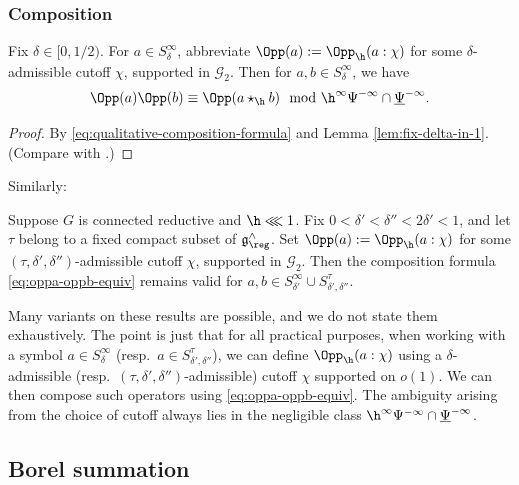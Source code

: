\subsubsection{Composition}

\begin{theorem}\label{thm:composition-formula-quantitative}
  Fix $\delta \in [0,1/2)$.  For \(a \in S_\delta^\infty\), abbreviate $\Opp(a) := \Opp_{\h}(a:\chi)$ for some $\delta$-admissible cutoff $\chi$, supported in $\mathcal{G}_2$.  Then for $a,b \in S_\delta^\infty$, we have
  \begin{equation}\label{eq:oppa-oppb-equiv}
    \Opp(a) \Opp(b) \equiv \Opp(a \star_{\h} b) \mod{ \h^\infty \Psi^{-\infty} \cap \underline{\Psi }^{-\infty}}.
  \end{equation}
\end{theorem}
\begin{proof}
  By \eqref{eq:qualitative-composition-formula} and Lemma \ref{lem:fix-delta-in-1}.  (Compare with \cite[Thm 10.8, (10.8)]{2020arXiv201202187N}.)
\end{proof}

Similarly:
\begin{theorem}
  Suppose $G$ is connected reductive and $\h \lll 1$.  Fix $0 < \delta ' < \delta '' < 2 \delta ' < 1$, and let $\tau$ belong to a fixed compact subset of $\mathfrak{g}^\wedge_{\reg}$.  Set $\Opp(a) := \Opp_{\h}(a:\chi)$ for some $(\tau, \delta ', \delta'')$-admissible cutoff $\chi$, supported in $\mathcal{G}_2$.  Then the composition formula \eqref{eq:oppa-oppb-equiv} remains valid for $a,b \in S_{\delta '}^{\infty} \cup S^{\tau}_{\delta ', \delta ''}$.
\end{theorem}

Many variants on these results are possible, and we do not state them exhaustively.  The point is just that for all practical purposes, when working with a symbol $a \in S^\infty_\delta$ (resp.\ $a \in S^\tau_{\delta ', \delta ''}$), we can define $\Opp_{\h}(a:\chi)$ using a $\delta$-admissible (resp.\ $(\tau, \delta ', \delta '')$-admissible) cutoff $\chi$ supported on $o(1)$.  We can then compose such operators using \eqref{eq:oppa-oppb-equiv}.  The ambiguity arising from the choice of cutoff always lies in the negligible class $\h^\infty \Psi^{-\infty} \cap \underline{\Psi }^{-\infty}$.

\subsection{Borel summation}

